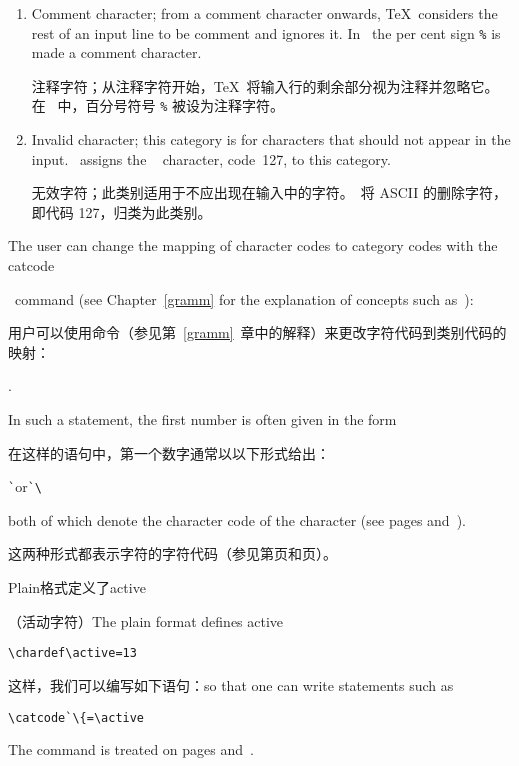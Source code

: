 \begin{enumerate}
      活动字符；活动字符充当 \TeX\ 命令，而不需要在前面加上转义字符。在 plain \TeX\ 中，只有波浪号 \verb-- 是活动字符，它被定义为生成不可分割的空格；参见第\pageref{tie} 页。%
\item\label{ini:comm} Comment character; from a comment character onwards,
      \TeX\ considers the rest of an input line to be
      comment and ignores it. In \IniTeX\ the  per cent sign \verb-%-
      is made a comment character.

      注释字符；从注释字符开始，\TeX\ 将输入行的剩余部分视为注释并忽略它。在 \IniTeX\ 中，百分号符号 \verb-%- 被设为注释字符。%
\item\label{ini:invalid} Invalid character; this category is for characters that
      should not appear in the input. \IniTeX\ assigns the
      \ascii\  character, code~127, to this category.

      无效字符；此类别适用于不应出现在输入中的字符。\IniTeX\ 将 ASCII 的删除字符，即代码 127，归类为此类别。%
\end{enumerate}

The user can change the mapping 
of character codes to category codes
with the \cstoidx catcode\par\ command (see Chapter~\ref{gramm}
for the explanation of concepts such as~):

用户可以使用命令（参见第~\ref{gramm}~章中的解释）来更改字符代码到类别代码的映射：
\begin{disp}.\end{disp}
In such a statement, the first number is often given in the form

在这样的语句中，第一个数字通常以以下形式给出：
\begin{disp}\verb>`>\quad or\quad \verb>`\>\end{disp}
both of which denote the character code of the character
(see pages \pageref{char:code} and~\pageref{int:denotation}).

这两种形式都表示字符的字符代码（参见第\pageref{char:code}页和\pageref{int:denotation}页）。

Plain格式定义了\csterm active \par（活动字符）\hfill The plain format defines
\csterm active\par
\begin{verbatim}
\chardef\active=13
\end{verbatim} 
这样，我们可以编写如下语句：\hfill so that one can write statements such as
\begin{verbatim}
\catcode`\{=\active
\end{verbatim}
The  command is  treated
on pages \pageref{chardef} and~\pageref{num:chardef}.

